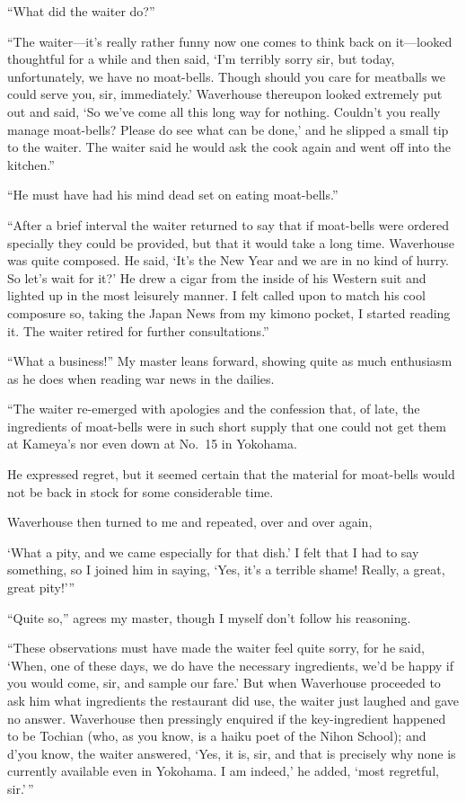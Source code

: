 \documentclass{book}
\begin{document}
``What did the waiter do?''

``The waiter---it's really rather funny now one comes to think back on
it---looked thoughtful for a while and then said, `I'm terribly sorry
sir, but today, unfortunately, we have no moat-bells. Though should you
care for meatballs we could serve you, sir, immediately.' Waverhouse
thereupon looked extremely put out and said, `So we've come all this
long way for nothing. Couldn't you really manage moat-bells? Please do
see what can be done,' and he slipped a small tip to the waiter. The
waiter said he would ask the cook again and went off into the kitchen.''

``He must have had his mind dead set on eating moat-bells.''

``After a brief interval the waiter returned to say that if moat-bells
were ordered specially they could be provided, but that it would take a
long time. Waverhouse was quite composed. He said, `It's the New Year
and we are in no kind of hurry. So let's wait for it?' He drew a cigar
from the inside of his Western suit and lighted up in the most leisurely
manner. I felt called upon to match his cool composure so, taking the
Japan News from my kimono pocket, I started reading it. The waiter
retired for further consultations.''

``What a business!'' My master leans forward, showing quite as much
enthusiasm as he does when reading war news in the dailies.

``The waiter re-emerged with apologies and the confession that, of late,
the ingredients of moat-bells were in such short supply that one could
not get them at Kameya's nor even down at No.~15 in Yokohama.

He expressed regret, but it seemed certain that the material for
moat-bells would not be back in stock for some considerable time.

Waverhouse then turned to me and repeated, over and over again,

`What a pity, and we came especially for that dish.' I felt that I had
to say something, so I joined him in saying, `Yes, it's a terrible
shame! Really, a great, great pity!'''

``Quite so,'' agrees my master, though I myself don't follow his
reasoning.

``These observations must have made the waiter feel quite sorry, for he
said, `When, one of these days, we do have the necessary ingredients,
we'd be happy if you would come, sir, and sample our fare.' But when
Waverhouse proceeded to ask him what ingredients the restaurant did use,
the waiter just laughed and gave no answer. Waverhouse then pressingly
enquired if the key-ingredient happened to be Tochian (who, as you know,
is a haiku poet of the Nihon School); and d'you know, the waiter
answered, `Yes, it is, sir, and that is precisely why none is currently
available even in Yokohama. I am indeed,' he added, `most regretful,
sir.'\,''
\end{document}
